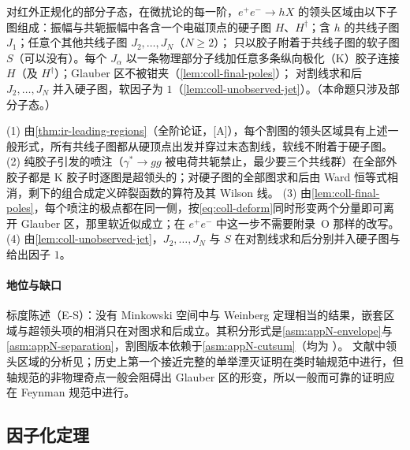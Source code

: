 \begin{proposition}\label{prop:coll-sia-regions}
对红外正规化的部分子态，在微扰论的每一阶，$e^+e^-\to hX$ 的领头区域由以下子图组成：振幅与共轭振幅中各含一个电磁顶点的硬子图 $H$、$H^\dagger$；含 $h$ 的共线子图 $J_1$；任意个其他共线子图 $J_2,\dots,J_N$（$N\ge2$）；
只以胶子附着于共线子图的软子图 $S$（可以没有）。每个 $J_\alpha$ 以一条物理部分子线加任意多条纵向极化（K）胶子连接 $H$（及 $H^\dagger$）；Glauber 区不被钳夹（\cref{lem:coll-final-poles}）；
对割线求和后 $J_2,\dots,J_N$ 并入硬子图，软因子为 $1$（\cref{lem:coll-unobserved-jet}）。（本命题只涉及部分子态。）
\end{proposition}

\begin{proofsketch}
(1) 由\cref{thm:ir-leading-regions}（全阶论证，[A]），每个割图的领头区域具有上述一般形式，所有共线子图都从硬顶点出发并穿过末态割线，软线不附着于硬子图。
(2) 纯胶子引发的喷注（$\gamma^*\to gg$ 被电荷共轭禁止，最少要三个共线群）在全部外胶子都是 K 胶子时逐图是超领头的；对硬子图的全部图求和后由 Ward 恒等式相消，剩下的组合成定义碎裂函数的算符及其 Wilson 线\cite[第~12.5.1~节]{Collins2011}。
(3) 由\cref{lem:coll-final-poles}，每个喷注的极点都在同一侧，按\cref{eq:coll-deform}同时形变两个分量即可离开 Glauber 区，那里软近似成立；在 $e^+e^-$ 中这一步不需要附录~O 那样的改写。
(4) 由\cref{lem:coll-unobserved-jet}，$J_2,\dots,J_N$ 与 $S$ 在对割线求和后分别并入硬子图与给出因子 $1$。
\end{proofsketch}

\paragraph{地位与缺口}
标度陈述（E-S）：没有 Minkowski 空间中与 Weinberg 定理相当的结果，嵌套区域与超领头项的相消只在对图求和后成立。其积分形式是\cref{asm:appN-envelope}与\cref{asm:appN-separation}，割图版本依赖于\cref{asm:appN-cutsum}（均为 \tagA）。
文献中领头区域的分析见\cite[第~12.5~节]{Collins2011}；历史上第一个接近完整的单举湮灭证明在类时轴规范中进行\cite{CollinsSterman1981}，但轴规范的非物理奇点一般会阻碍出 Glauber 区的形变，所以一般而可靠的证明应在 Feynman 规范中进行\cite[第~12.6~节]{Collins2011}。

\subsection{因子化定理}

